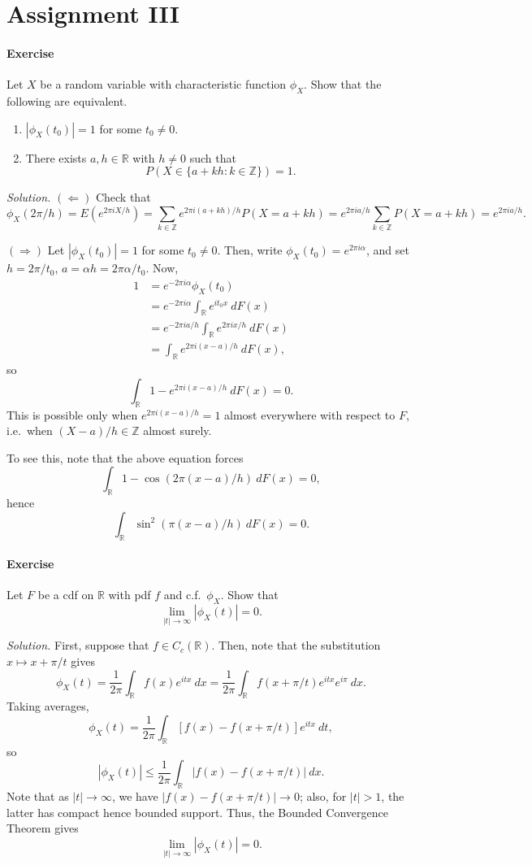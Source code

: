 \documentclass[10pt]{article}
\newcounter{prob}
\newcommand{\problem}{\stepcounter{prob}\paragraph{Exercise \arabic{prob}}}
\newcommand{\solution}{\textit{Solution.} }
\newcommand{\R}{\mathbb{R}}
\newcommand{\Z}{\mathbb{Z}}
\begin{document}
    \clearpage
    \section*{Assignment III}
    \setcounter{prob}{0}

    \problem Let $X$ be a random variable with characteristic function $\phi_X$. Show
    that the following are equivalent.
    \begin{enumerate}
        \item $|\phi_X(t_0)| = 1$ for some $t_0 \neq 0$.
        \item There exists $a, h \in \R$ with $h \neq 0$ such that \[
            P(X \in \{a + kh : k \in \Z\}) = 1.
        \]
    \end{enumerate}

    \solution $(\Leftarrow)$ Check that \[
        \phi_X(2\pi / h) = E(e^{2\pi iX /h}) = \sum_{k \in \Z} e^{2\pi i(a + kh) / h}
        P(X = a + kh) = e^{2\pi i a / h} \sum_{k \in \Z} P(X = a + kh) = e^{2\pi i a
        / h}.
    \]

    $(\Rightarrow)$ Let $|\phi_X(t_0)| = 1$ for some $t_0 \neq 0$. Then, write
    $\phi_X(t_0) = e^{2\pi i\alpha}$, and set $h = 2\pi / t_0$, $a = \alpha h = 2\pi
    \alpha / t_0$. Now, \begin{align*}
        1
        &= e^{-2\pi i \alpha} \phi_{X}(t_0) \\
        &= e^{-2\pi i \alpha} \int_\R e^{i t_0 x} \:dF(x) \\
        &= e^{-2\pi i a / h} \int_\R e^{2\pi i x / h} \:dF(x) \\
        &= \int_\R e^{2\pi i (x - a) / h} \:dF(x),
    \end{align*}
    so \[
        \int_\R 1 - e^{2\pi i (x - a) / h} \:dF(x) = 0.
    \] This is possible only when $e^{2\pi i (x - a) / h} = 1$ almost everywhere with
    respect to $F$, i.e.\ when $(X - a) / h \in \Z$ almost surely.

    To see this, note that the above equation forces \[
        \int_\R 1 - \cos(2\pi (x - a) / h) \:dF(x) = 0,
    \] hence \[
        \int_\R \sin^2(\pi(x - a) / h) \:dF(x) = 0.
    \]


    \problem Let $F$ be a cdf on $\R$ with pdf $f$ and c.f.\ $\phi_X$. Show that \[
        \lim_{|t| \to \infty} |\phi_X(t)| = 0.
    \]

    \solution First, suppose that $f \in C_c(\R)$. Then, note that the substitution
    $x \mapsto x + \pi / t$ gives \[
        \phi_X(t) = \frac{1}{2\pi} \int_\R f(x) e^{itx}\:dx
        = \frac{1}{2\pi} \int_\R f(x + \pi / t) e^{itx} e^{i\pi} \:dx.
    \] Taking averages, \[
        \phi_X(t) = \frac{1}{2\pi} \int_\R [f(x) - f(x + \pi / t)] e^{itx}\:dt,
    \] so \[
        |\phi_X(t)| \leq \frac{1}{2\pi} \int_\R |f(x) - f(x + \pi / t)| \:dx.
    \] Note that as $|t| \to \infty$, we have $|f(x) - f(x + \pi / t)| \to 0$; also,
    for $|t| > 1$, the latter has compact hence bounded support. Thus, the Bounded
    Convergence Theorem gives \[
        \lim_{|t| \to \infty} |\phi_X(t)| = 0.
    \]
\end{document}
